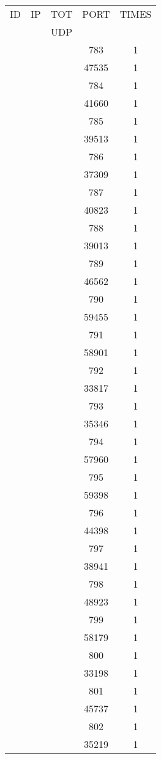 \documentclass[a4paper]{scrartcl}
\begin{document}
\begin{minipage}[b]{0.5\linewidth}
\begin{tabular}{| c | c | c | c | c |}
\hline
ID & IP & TOT & PORT & TIMES \\ 
   &    & UDP &      &       \\ 
\hline
& & & 783 & 1 \\ & & & 47535 & 1 \\ & & & 784 & 1 \\ & & & 41660 & 1 \\ & & & 785 & 1 \\ & & & 39513 & 1 \\ & & & 786 & 1 \\ & & & 37309 & 1 \\ & & & 787 & 1 \\ & & & 40823 & 1 \\ & & & 788 & 1 \\ & & & 39013 & 1 \\ & & & 789 & 1 \\ & & & 46562 & 1 \\ & & & 790 & 1 \\ & & & 59455 & 1 \\ & & & 791 & 1 \\ & & & 58901 & 1 \\ & & & 792 & 1 \\ & & & 33817 & 1 \\ & & & 793 & 1 \\ & & & 35346 & 1 \\ & & & 794 & 1 \\ & & & 57960 & 1 \\ & & & 795 & 1 \\ & & & 59398 & 1 \\ & & & 796 & 1 \\ & & & 44398 & 1 \\ & & & 797 & 1 \\ & & & 38941 & 1 \\ & & & 798 & 1 \\ & & & 48923 & 1 \\ & & & 799 & 1 \\ & & & 58179 & 1 \\ & & & 800 & 1 \\ & & & 33198 & 1 \\ & & & 801 & 1 \\ & & & 45737 & 1 \\ & & & 802 & 1 \\ & & & 35219 & 1 \\ \hline\end{tabular}\end{minipage} \hfill\begin{minipage}[b]{0.5\linewidth}\begin{tabular}{| c | c | c | c | c |}

\end{tabular}
\end{minipage}
\end{document}
